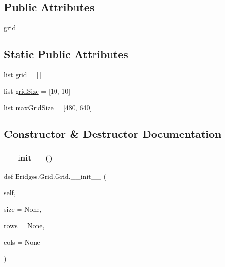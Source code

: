 \subsection*{Public Attributes}
\begin{DoxyCompactItemize}
\item 
\mbox{\hyperlink{class_bridges_1_1_grid_1_1_grid_a7e3fd2bd085616102e390737a096bcac}{grid}}
\end{DoxyCompactItemize}
\subsection*{Static Public Attributes}
\begin{DoxyCompactItemize}
\item 
list \mbox{\hyperlink{class_bridges_1_1_grid_1_1_grid_abe5f95802dde51888b47f465caa63d76}{grid}} = \mbox{[}$\,$\mbox{]}
\item 
list \mbox{\hyperlink{class_bridges_1_1_grid_1_1_grid_ace0915cd8922ad37d390e08a3a370700}{grid\+Size}} = \mbox{[}10, 10\mbox{]}
\item 
list \mbox{\hyperlink{class_bridges_1_1_grid_1_1_grid_aca620cf7545089b3bb603a7bd035afd6}{max\+Grid\+Size}} = \mbox{[}480, 640\mbox{]}
\end{DoxyCompactItemize}


\subsection{Constructor \& Destructor Documentation}
\mbox{\label{class_bridges_1_1_grid_1_1_grid_a5a0a993fcdb28d59bfc32024a7dea0ae}} 
\subsubsection{\texorpdfstring{\+\_\+\+\_\+init\+\_\+\+\_\+()}{\_\_init\_\_()}}
{\footnotesize\ttfamily def Bridges.\+Grid.\+Grid.\+\_\+\+\_\+init\+\_\+\+\_\+ (\begin{DoxyParamCaption}\item[{}]{self,  }\item[{}]{size = {\ttfamily None},  }\item[{}]{rows = {\ttfamily None},  }\item[{}]{cols = {\ttfamily None} }\end{DoxyParamCaption})}



